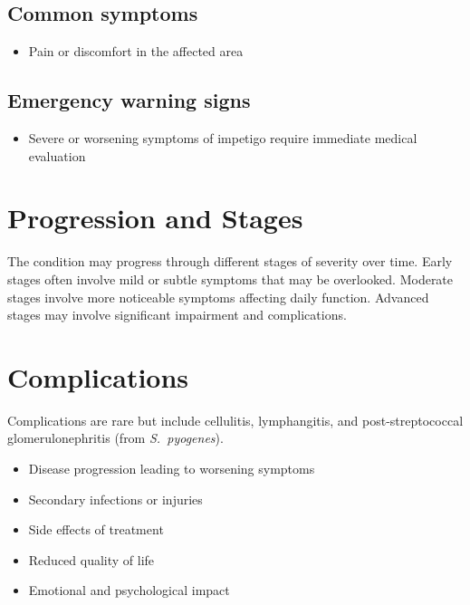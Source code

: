 \subsection{Common symptoms}
\begin{itemize}[noitemsep]
  \item Pain or discomfort in the affected area
  \end{itemize}

\subsection{Emergency warning signs}
\begin{itemize}[noitemsep]
  \item Severe or worsening symptoms of impetigo require immediate medical evaluation
\end{itemize}
\section{Progression and Stages}
The condition may progress through different stages of severity over time. Early stages often involve mild or subtle symptoms that may be overlooked. Moderate stages involve more noticeable symptoms affecting daily function. Advanced stages may involve significant impairment and complications.
\section{Complications}
Complications are rare but include cellulitis, lymphangitis, and post-streptococcal glomerulonephritis (from \textit{S.~pyogenes}).

\begin{itemize}[noitemsep]
  \item Disease progression leading to worsening symptoms
  \item Secondary infections or injuries
  \item Side effects of treatment
  \item Reduced quality of life
  \item Emotional and psychological impact
\end{itemize}
